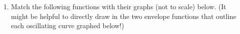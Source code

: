 \documentclass{article}
\begin{document}
\begin{enumerate}
\begin{enumerate}
\newpage


\item Match the following functions with their graphs (not to scale) below. (It might be helpful to directly draw in the two envelope functions that outline each oscillating curve graphed below!)

\begin{enumerate}
    

\end{enumerate}


\end{enumerate}
\end{enumerate}
\end{document}
